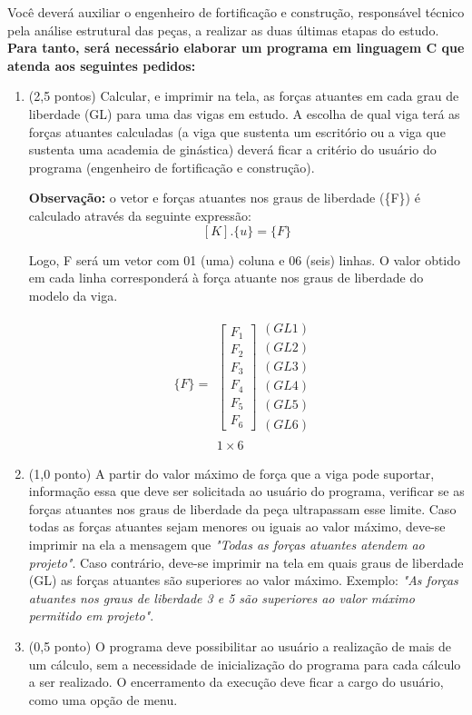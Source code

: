 \documentclass[12pt,a4paper]{article}
\begin{document}
Você deverá auxiliar o engenheiro de fortificação e construção, responsável técnico pela análise estrutural das peças, a realizar as duas últimas etapas do estudo.
\textbf{Para tanto, será necessário elaborar um programa em linguagem C que atenda aos seguintes pedidos:}
\begin{enumerate}[label=(\alph*)]
\item (2,5 pontos) Calcular, e imprimir na tela, as forças atuantes em cada grau de liberdade (GL) para uma das vigas em estudo. A escolha de qual viga terá as forças atuantes calculadas (a viga que sustenta um escritório ou a viga que sustenta uma academia de ginástica) deverá ficar a critério do usuário do programa (engenheiro de fortificação e construção).

\textbf{Observação: }o vetor e forças atuantes nos graus de liberdade (\{F\}) é calculado através da seguinte expressão: $$[K].\{u\} = \{F\}$$

Logo, {F} será um vetor com 01 (uma) coluna e 06 (seis) linhas. O valor obtido em cada linha corresponderá à força atuante nos graus de liberdade do modelo da viga.

$$\{F\} = \begin{array}{c}
\left[ \begin{array}{c}F_1 \\ F_2 \\ F_3 \\ F_4 \\ F_5 \\ F_6\end{array}  \right] \begin{array}{c} (GL 1) \\ (GL 2) \\ (GL 3) \\ (GL 4) \\ (GL 5) \\ (GL 6) \end{array} \\ 1 \times 6
\end{array}$$

\item (1,0 ponto) A partir do valor máximo de força que a viga pode suportar, informação essa que deve ser solicitada ao usuário do programa, verificar se as forças atuantes nos graus de liberdade da peça ultrapassam esse limite. Caso todas as forças atuantes sejam menores ou iguais ao valor máximo, deve-se imprimir na ela a mensagem que \textit{"Todas as forças atuantes atendem ao projeto"}. Caso contrário, deve-se imprimir na tela em quais graus de liberdade (GL) as forças atuantes são superiores ao valor máximo. Exemplo: \textit{"As forças atuantes nos graus de liberdade 3 e 5 são superiores ao valor máximo permitido em projeto"}.

\item (0,5 ponto) O programa deve possibilitar ao usuário a realização de mais de um cálculo, sem a necessidade de inicialização do programa para cada cálculo a ser realizado. O encerramento da execução deve ficar a cargo do usuário, como uma opção de menu.


\end{enumerate}
\end{document}
